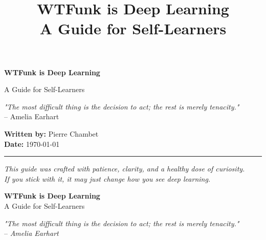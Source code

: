 \documentclass[11pt]{article}
\title{\Huge \textbf{WTFunk is Deep Learning}\\[0.5em] \Large A Guide for Self-Learners}
\author{}
\date{}
\begin{document}
\begin{titlepage}
    \centering

    \vspace*{2cm}

    {\Huge \bfseries WTFunk is Deep Learning\par}
    \vspace{0.5em}
    {\Large A Guide for Self-Learners\par}

    \vspace{2cm}
    {\Large \textit{"The most difficult thing is the decision to act; the rest is merely tenacity."}}\\
    \vspace{0.2em}
    {\large -- Amelia Earhart}

    \vfill

    \begin{flushright}
        \textbf{Written by:} Pierre Chambet \\
        \textbf{Date:} \today
    \end{flushright}

    \vspace{1cm}

    \rule{\textwidth}{0.4pt}

    \vspace{0.5em}
    {\small \textit{This guide was crafted with patience, clarity, and a healthy dose of curiosity.}}\\
    {\small \textit{If you stick with it, it may just change how you see deep learning.}}
\end{titlepage}


\newpage

\begin{center}
    {\Huge \textbf{WTFunk is Deep Learning}}\\[0.3em]
    {\Large A Guide for Self-Learners}
\end{center}

\vspace{1em}

\begin{tcolorbox}[colback=gray!5, colframe=gray!50!black, boxrule=0.3mm, sharp corners=southwest, title style={draw=none, fill=none}, title=]
\emph{"The most difficult thing is the decision to act; the rest is merely tenacity."} \\
\hfill -- \emph{Amelia Earhart}
\end{tcolorbox}

\vspace{1em}
\end{document}

